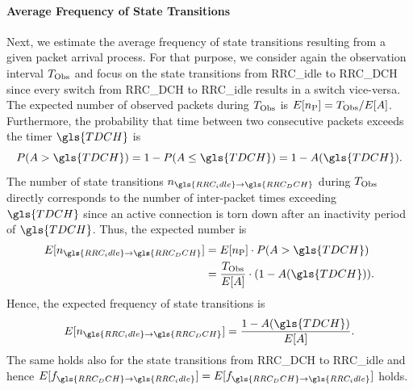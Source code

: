 \paragraph*{Average Frequency of State Transitions}

\newcommand{\NStateTransitionsIdleToDCH}{n_{\gls{RRC_idle}\rightarrow\gls{RRC_DCH}}}
\newcommand{\NStateTransitionsDCHToIdle}{n_{\gls{RRC_DCH}\rightarrow\gls{RRC_idle}}}
\newcommand{\fStateTransitionsIdleToDCH}{f_{\gls{RRC_idle}\rightarrow\gls{RRC_DCH}}}
\newcommand{\fStateTransitionsDCHToIdle}{f_{\gls{RRC_DCH}\rightarrow\gls{RRC_idle}}}

Next, we estimate the average frequency of state transitions resulting from a given packet arrival process.
For that purpose, we consider again the observation interval \(T_{\text{Obs}}\) and focus on the state transitions from \gls{RRC_idle} to \gls{RRC_DCH} since every switch from \gls{RRC_DCH} to \gls{RRC_idle} results in a switch vice-versa.
The expected number of observed packets during \(T_{\text{Obs}}\) is 
\(E[n_{\text{P}}]=T_{\text{Obs}}/E[A]\). 
Furthermore, the probability that time between two consecutive packets exceeds the timer \(\gls{TDCH}\) is
\begin{equation} 
P(\PacketIAT > \gls{TDCH}) = 1 - P(\PacketIAT \leq \gls{TDCH}) = 1 - \PacketIAT(\gls{TDCH}).
\end{equation} 
The number of state transitions \(\NStateTransitionsIdleToDCH\) during \(T_{\text{Obs}}\) directly corresponds to the number of inter-packet times exceeding \(\gls{TDCH}\) since an active connection is torn down after an inactivity period of \(\gls{TDCH}\).
Thus, the expected number is 
\begin{align*}
\begin{split}
E[\NStateTransitionsIdleToDCH] & = E[\NObservedPackets] \cdot P(\PacketIAT > \gls{TDCH})\\
	& = \frac{\ObservationInterval}{E[\PacketIAT]}\cdot (1-\PacketIAT(\gls{TDCH})). 
\end{split}
\end{align*} 
Hence, the expected frequency of state transitions is 
\begin{equation*}
E[\NStateTransitionsIdleToDCH]=\frac{1-\PacketIAT(\gls{TDCH})}{E[\PacketIAT]}.
\end{equation*}
The same holds also for the state transitions from \gls{RRC_DCH} to \gls{RRC_idle} and hence 
\(E[\fStateTransitionsDCHToIdle]=E[\fStateTransitionsDCHToIdle]\)
holds.

